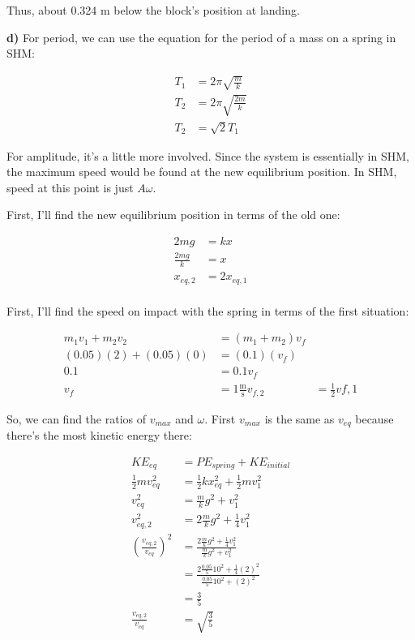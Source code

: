 \documentclass{article}
\begin{document}
Thus, about 0.324 m below the block's position at landing.

\vspace{1cm}

\large\textbf{d)} For period, we can use the equation for the period of a mass on a spring in SHM:

\begin{align*}
    T_1 &= 2\pi\sqrt{\frac{m}{k}} \\
    T_2 &= 2\pi\sqrt{\frac{2m}{k}} \\
    T_2 &= \sqrt{2}T_1
\end{align*}

For amplitude, it's a little more involved. Since the system is essentially in SHM, the maximum speed would be found at the new equilibrium position. In SHM, speed at this point is just $A\omega$.

First, I'll find the new equilibrium position in terms of the old one:

\begin{align*}
    2mg &= kx \\
    \frac{2mg}{k} &= x \\
    x_{eq,2} &= 2x_{eq,1} \\
\end{align*}

First, I'll find the speed on impact with the spring in terms of the first situation:

\begin{align*}
    m_1v_1+m_2v_2 &= (m_1+m_2)v_f \\
    (0.05)(2) + (0.05)(0) &= (0.1)(v_f) \\
    0.1 &= 0.1v_f \\
    v_f &= 1 \frac{\text{m}}{\text{s}}
    v_{f,2} &= \frac{1}{2}v{f,1} 
\end{align*}

So, we can find the ratios of $v_{max}$ and ${\omega}$. First $v_{max}$ is the same as $v_{eq}$ because there's the most kinetic energy there:

\begin{align*}
    KE_{eq} &= PE_{spring} + KE_{initial} \\
    \frac{1}{2}mv_{eq}^2 &= \frac{1}{2}kx_{eq}^2 + \frac{1}{2}mv_1^2 \\
    v_{eq}^2 &= \frac{m}{k} g^2 + v_1^2 \\
    v_{eq,2}^2 &= 2 \frac{m}{k} g^2 + \frac{1}{4}v_1^2 \\
    \left(\frac{v_{eq,2}}{v_{eq}}\right)^2 &= \frac{2\frac{m}{k}g^2 + \frac{1}{4}v_1^2}{\frac{m}{k}g^2 + v_1^2} \\
    &= \frac{2\frac{0.05}{5}10^2 + \frac{1}{4}(2)^2}{\frac{0.05}{5}10^2 + (2)^2} \\
    &= \frac{3}{5} \\
    \frac{v_{eq,2}}{v_{eq}} &= \sqrt{\frac{3}{5}}
\end{align*}
\end{document}
